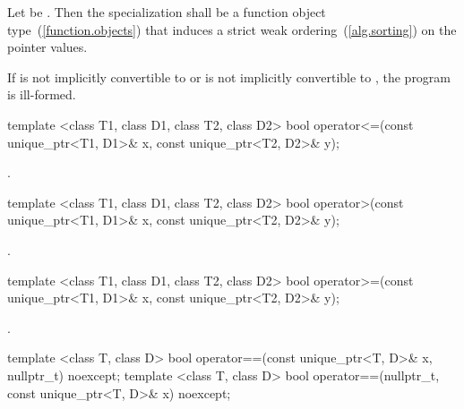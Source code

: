 \begin{itemdescr}
\pnum
\requires Let  be 
. Then the specialization
 shall be a function object type~(\ref{function.objects}) that
induces a strict weak ordering~(\ref{alg.sorting}) on the pointer values.

\pnum
\returns {}

\pnum
\remarks If  is not implicitly convertible
to  or  is not implicitly
convertible to , the program is ill-formed.
\end{itemdescr}

%
%
\begin{itemdecl}
template <class T1, class D1, class T2, class D2>
  bool operator<=(const unique_ptr<T1, D1>& x, const unique_ptr<T2, D2>& y);
\end{itemdecl}

\begin{itemdescr}
\pnum
\returns {}.
\end{itemdescr}

%
%
\begin{itemdecl}
template <class T1, class D1, class T2, class D2>
  bool operator>(const unique_ptr<T1, D1>& x, const unique_ptr<T2, D2>& y);
\end{itemdecl}

\begin{itemdescr}
\pnum
\returns {}.
\end{itemdescr}

%
%
\begin{itemdecl}
template <class T1, class D1, class T2, class D2>
  bool operator>=(const unique_ptr<T1, D1>& x, const unique_ptr<T2, D2>& y);
\end{itemdecl}

\begin{itemdescr}
\pnum
\returns {}.
\end{itemdescr}

%
%
\begin{itemdecl}
template <class T, class D>
  bool operator==(const unique_ptr<T, D>& x, nullptr_t) noexcept;
template <class T, class D>
  bool operator==(nullptr_t, const unique_ptr<T, D>& x) noexcept;
\end{itemdecl}

